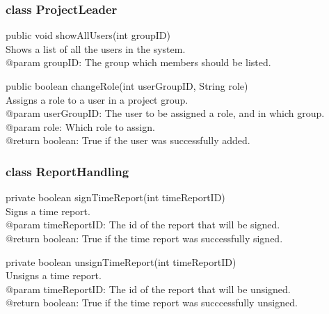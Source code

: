 \documentclass[a4paper]{article}
\begin{document}
\subsubsection{class ProjectLeader}

\begin{hangparas}{1.5em}{1}
public void showAllUsers(int groupID)\\
Shows a list of all the users in the system.\\
@param groupID: The group which members should be listed.
\end{hangparas}

\vspace{5mm}
\begin{hangparas}{1.5em}{1}
public boolean changeRole(int userGroupID, String role)\\
Assigns a role to a user in a project group.\\
@param userGroupID: The user to be assigned a role, and in which group.\\
@param role: Which role to assign.\\
@return boolean: True if the user was successfully added.\\
\end{hangparas}

\subsubsection{class ReportHandling}

\begin{hangparas}{1.5em}{1}
private boolean signTimeReport(int timeReportID)\\
Signs a time report.\\
@param timeReportID: The id of the report that will be signed.\\
@return boolean: True if the time report was successfully signed.
\end{hangparas}

\vspace{5mm}
\begin{hangparas}{1.5em}{1}
private boolean unsignTimeReport(int timeReportID)\\
Unsigns a time report.\\
@param timeReportID: The id of the report that will be unsigned.\\
@return boolean: True if the time report was succcessfully unsigned.
\end{hangparas}
\end{document}
